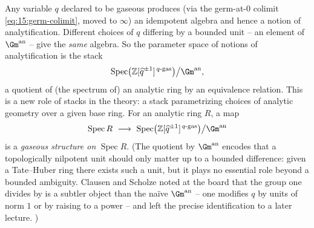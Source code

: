 \begin{remark}
\label{rmk:15:analytification-stack}
Any variable $q$ declared to be gaseous produces (via the germ-at-$0$ colimit
\eqref{eq:15:germ-colimit}, moved to $\infty$) an idempotent algebra and hence a
notion of analytification. Different choices of $q$ differing by a bounded unit --
an element of $\Gm^{\mathrm{an}}$ -- give the \emph{same} algebra. So the parameter
space of notions of analytification is the stack
\begin{equation}
\label{eq:15:analytification-stack}
\operatorname{Spec}\bigl(\mathbb{Z}[\widehat q^{\pm1}]^{\,q\text{-}\mathrm{gas}}\bigr)\big/\Gm^{\mathrm{an}},
\end{equation}
a quotient of (the spectrum of) an analytic ring by an equivalence relation. This is a
new role of stacks in the theory: a stack parametrizing choices of analytic geometry
over a given base ring. For an analytic ring $R$, a map
\begin{equation}
\label{eq:15:gaseous-structure-map}
\operatorname{Spec} R\ \longrightarrow\ \operatorname{Spec}\bigl(\mathbb{Z}[\widehat q^{\pm1}]^{\,q\text{-}\mathrm{gas}}\bigr)\big/\Gm^{\mathrm{an}}
\end{equation}
is a \emph{gaseous structure on} $\operatorname{Spec} R$. (The quotient by
$\Gm^{\mathrm{an}}$ encodes that a topologically nilpotent unit should only matter up
to a bounded difference: given a Tate--Huber ring there exists such a unit, but it
plays no essential role beyond a bounded ambiguity. Clausen and Scholze noted at the
board that the group one divides by is a subtler object than the na\"ive
$\Gm^{\mathrm{an}}$ -- one modifies $q$ by units of norm $1$ or by raising to a power
-- and left the precise identification to a later lecture.
)
\end{remark}

